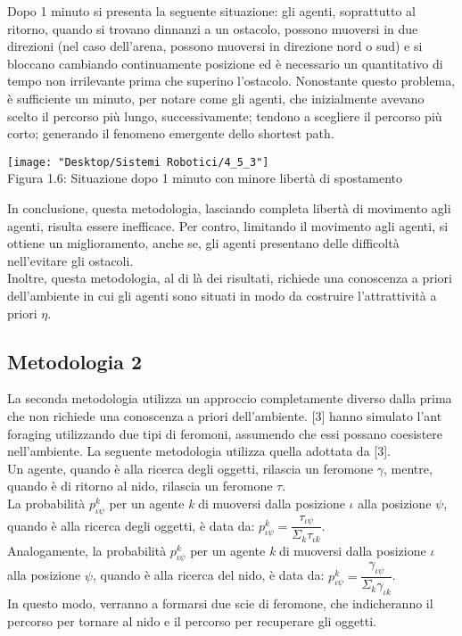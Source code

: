 \documentclass[12pt,a4paper,openright,twoside]{report}
\begin{document}
Dopo 1 minuto si presenta la seguente situazione: gli agenti, soprattutto al ritorno, quando si trovano dinnanzi a un ostacolo, possono muoversi in due direzioni (nel caso dell'arena, possono muoversi in direzione nord o sud) e si bloccano cambiando continuamente posizione ed è necessario un quantitativo di tempo non irrilevante prima che superino l'ostacolo. Nonostante questo problema, è sufficiente un minuto, per notare come gli agenti, che inizialmente avevano scelto il percorso più lungo, successivamente; tendono a scegliere il percorso più corto; generando il fenomeno emergente dello shortest path.

\begin{center}  
	\texttt{[image: "Desktop/Sistemi Robotici/4\_5\_3"]}
	\\Figura 1.6: Situazione dopo 1 minuto con minore libertà di spostamento
\end{center}

In conclusione, questa metodologia, lasciando completa libertà di movimento agli agenti, risulta essere inefficace. Per contro, limitando il movimento agli agenti, si ottiene un miglioramento, anche se, gli agenti presentano delle difficoltà nell'evitare gli ostacoli.\\
Inoltre, questa metodologia, al di là dei risultati, richiede una conoscenza a priori dell'ambiente in cui gli agenti sono situati in modo da costruire l'attrattività a priori $\eta$.

\subsection{Metodologia 2}

La seconda metodologia utilizza un approccio completamente diverso dalla prima che non richiede una conoscenza a priori dell'ambiente. [3] hanno simulato l'ant foraging utilizzando due tipi di feromoni, assumendo che essi possano coesistere nell'ambiente. La seguente metodologia utilizza quella adottata da [3].\\
Un agente, quando è alla ricerca degli oggetti, rilascia un feromone $\gamma$, mentre, quando è di ritorno al nido, rilascia un feromone $\tau$.\\
La probabilità $p^k_{\iota\psi}$ per un agente \textit{k} di muoversi dalla posizione $\iota$ alla posizione $\psi$, quando è alla ricerca degli oggetti, è data da: $p^k_{\iota\psi}= \dfrac{\tau_{\iota\psi}}{\Sigma_k\tau_{\iota k}}$.\\
Analogamente, la probabilità $p^k_{\iota\psi}$ per un agente \textit{k} di muoversi dalla posizione $\iota$ alla posizione $\psi$, quando è alla ricerca del nido, è data da: $p^k_{\iota\psi}= \dfrac{\gamma_{\iota\psi}}{\Sigma_k\gamma_{\iota k}}$.\\
In questo modo, verranno a formarsi due scie di feromone, che indicheranno il percorso per tornare al nido e il percorso per recuperare gli oggetti.\\
\end{document}
